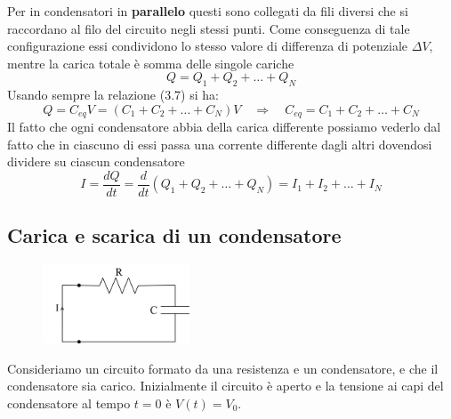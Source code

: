 Per in condensatori in \textbf{parallelo} questi sono collegati da fili  diversi che si raccordano al filo del circuito negli stessi punti. Come conseguenza di tale configurazione essi condividono lo stesso valore di differenza di potenziale $\Delta V$, mentre la carica totale \`e somma delle singole cariche 
\begin{equation*}
	Q = Q_{1} + Q_{2} + \ldots + Q_{N}
\end{equation*}  
Usando sempre la relazione (3.7) si ha:
\begin{equation*}
	Q = C_{eq} V = (C_1 + C_{2} + \ldots + C_{N})V \quad \Rightarrow \quad C_{eq} = C_{1} + C_{2} + \ldots + C_{N}
\end{equation*}
Il fatto che ogni condensatore abbia della carica differente possiamo vederlo dal fatto che in ciascuno di essi passa una corrente differente dagli altri dovendosi dividere su ciascun condensatore 
\begin{equation*}
	I = \frac{dQ}{dt} = \frac{d}{dt}(Q_{1} + Q_{2} + \ldots + Q_{N}) = I_{1} + I_{2} + \ldots + I_{N} 
\end{equation*}

\subsection{Carica e scarica di un condensatore }
\begin{figure}
  \centering
  \includegraphics[width=0.39\textwidth]{images/RC_open}
\end{figure}
Consideriamo un circuito formato da una resistenza e un condensatore, e che il condensatore sia carico. Inizialmente il circuito \`e aperto e la tensione ai capi del condensatore al tempo $t = 0$ \`e $V(t) = V_0$. 

